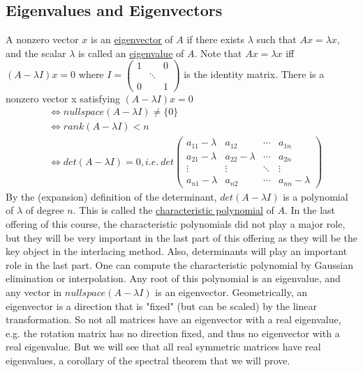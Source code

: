 \documentclass[11pt,a4paper]{report}
\begin{document}
\subsection{Eigenvalues and Eigenvectors}
A nonzero vector $x$ is an \underline{eigenvector} of $A$ if there exists $\lambda$ such that $Ax=\lambda x$, and the scalar $\lambda$ is called an \underline{eigenvalue} of $A$.
\newline Note that $Ax=\lambda x$ iff $(A-\lambda I)x = 0$ where $I = \begin{pmatrix}1 & & 0 \\ & \ddots & \\ 0 & & 1 \end{pmatrix}$ is the identity matrix.
\newline There is a nonzero vector x satisfying $(A-\lambda I)x = 0$
\begin{align*}
&\iff nullspace(A-\lambda I)\ne \{0\} \\
& \iff rank(A-\lambda I) < n \\
& \iff det(A-\lambda I)=0, 
i.e. \ det\begin{pmatrix}
a_{11}-\lambda & a_{12} & \cdots & a_{1n} \\
a_{21}-\lambda & a_{22}-\lambda & \cdots & a_{2n} \\
\vdots & \vdots & \ddots & \vdots \\
a_{n1}-\lambda & a_{n2} & \cdots & a_{nn}-\lambda
\end{pmatrix}
\end{align*}
By the (expansion) definition of the determinant, $det(A-\lambda I)$ is a polynomial of $\lambda$ of degree $n$.
\newline This is called the \underline{characteristic polynomial} of $A$.
\newline In the last offering of this course, the characteristic polynomials did not play a major role, but they will be very important in the last part of this offering as they will be the key object in the interlacing method. Also, determinants will play an important role in the last part.
\newline\newline One can compute the characteristic polynomial by Gaussian elimination or interpolation.
\newline Any root of this polynomial is an eigenvalue, and any vector in $nullspace(A-\lambda I)$ is an eigenvector.
\newline Geometrically, an eigenvector is a direction that is "fixed" (but can be scaled) by the linear transformation.
\newline So not all matrices have an eigenvector with a real eigenvalue, e.g. the rotation matrix has no direction fixed, and thus no eigenvector with a real eigenvalue.
\newline But we will see that all real symmetric matrices have real eigenvalues, a corollary of the spectral theorem that we will prove.
\end{document}
